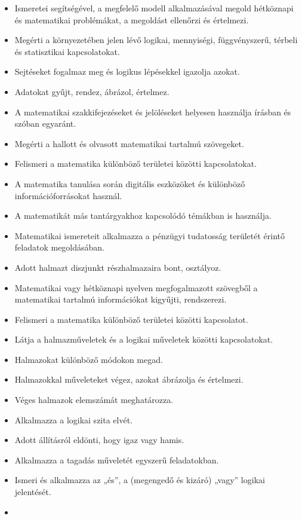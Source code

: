 \begin{itemize}
\item
  Ismeretei segítségével, a megfelelő modell alkalmazásával megold
  hétköznapi és matematikai problémákat, a megoldást ellenőrzi és
  értelmezi.
\item
  Megérti a környezetében jelen lévő logikai, mennyiségi, függvényszerű,
  térbeli és statisztikai kapcsolatokat.
\item
  Sejtéseket fogalmaz meg és logikus lépésekkel igazolja azokat.
\item
  Adatokat gyűjt, rendez, ábrázol, értelmez.
\item
  A matematikai szakkifejezéseket és jelöléseket helyesen használja
  írásban és szóban egyaránt.
\item
  Megérti a hallott és olvasott matematikai tartalmú szövegeket.
\item
  Felismeri a matematika különböző területei közötti kapcsolatokat.
\item
  A matematika tanulása során digitális eszközöket és különböző
  információforrásokat használ.
\item
  A matematikát más tantárgyakhoz kapcsolódó témákban is használja.
\item
  Matematikai ismereteit alkalmazza a pénzügyi tudatosság területét
  érintő feladatok megoldásában.
\item
  Adott halmazt diszjunkt részhalmazaira bont, osztályoz.
\item
  Matematikai vagy hétköznapi nyelven megfogalmazott szövegből a
  matematikai tartalmú információkat kigyűjti, rendszerezi.
\item
  Felismeri a matematika különböző területei közötti kapcsolatot.
\item
  Látja a halmazműveletek és a logikai műveletek közötti kapcsolatokat.
\item
  Halmazokat különböző módokon megad.
\item
  Halmazokkal műveleteket végez, azokat ábrázolja és értelmezi.
\item
  Véges halmazok elemszámát meghatározza.
\item
  Alkalmazza a logikai szita elvét.
\item
  Adott állításról eldönti, hogy igaz vagy hamis.
\item
  Alkalmazza a tagadás műveletét egyszerű feladatokban.
\item
  Ismeri és alkalmazza az „és'', a (megengedő és kizáró) „vagy'' logikai
  jelentését.
\item

\end{itemize}
